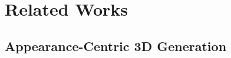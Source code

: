 \documentclass[11pt]{article}
\def\ourname{PhysX-Omni}
\begin{document}
\section{Related Works}
\label{sec:related}





    

  
    








\subsection{Appearance-Centric 3D Generation}
\end{document}
